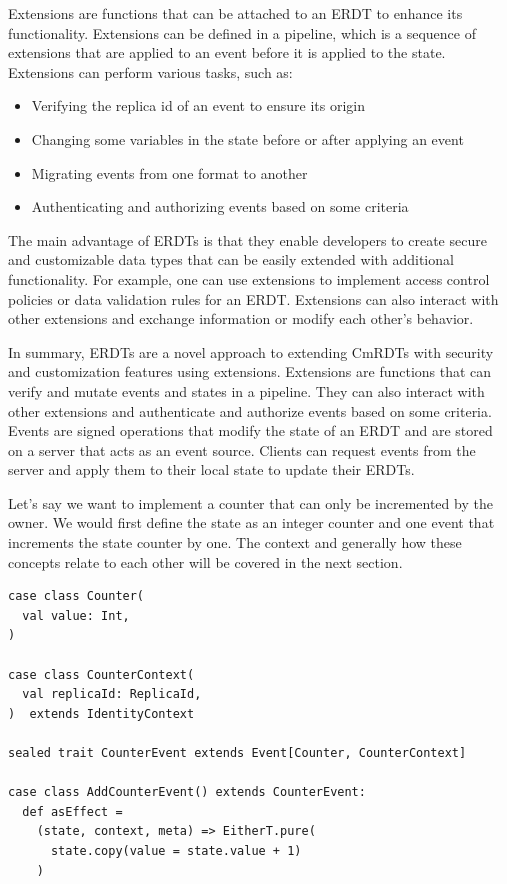 \documentclass[
	english,
	ruledheaders=section,   %
	class=report,		    %
	thesis={type=bachelor}, %
	accentcolor=9c,			%
	custommargins=true,    %
	marginpar=false,        %
	parskip=half-,          %
	fontsize=11pt,          %
]{tudapub}
\begin{document}
Extensions are functions that can be attached to an ERDT to enhance its functionality. Extensions can be defined in a pipeline, which is a sequence of extensions that are applied to an event before it is applied to the state. Extensions can perform various tasks, such as:

\begin{itemize}
  \item Verifying the replica id of an event to ensure its origin
  \item Changing some variables in the state before or after applying an event
  \item Migrating events from one format to another
  \item Authenticating and authorizing events based on some criteria
\end{itemize}

The main advantage of ERDTs is that they enable developers to create secure and customizable data types that can be easily extended with additional functionality. For example, one can use extensions to implement access control policies or data validation rules for an ERDT. Extensions can also interact with other extensions and exchange information or modify each other’s behavior.

In summary, ERDTs are a novel approach to extending CmRDTs with security and customization features using extensions. Extensions are functions that can verify and mutate events and states in a pipeline. They can also interact with other extensions and authenticate and authorize events based on some criteria. Events are signed operations that modify the state of an ERDT and are stored on a server that acts as an event source. Clients can request events from the server and apply them to their local state to update their ERDTs.


Let's say we want to implement a counter that can only be incremented by the owner. We would first define the state as an integer counter and one event that increments the state counter by one. The context and generally how these concepts relate to each other will be covered in the next section.

\begin{lstlisting}
case class Counter(
  val value: Int,
) 

case class CounterContext(
  val replicaId: ReplicaId,
)  extends IdentityContext

sealed trait CounterEvent extends Event[Counter, CounterContext]

case class AddCounterEvent() extends CounterEvent:
  def asEffect =
    (state, context, meta) => EitherT.pure(
      state.copy(value = state.value + 1)
    )

\end{lstlisting}
\end{document}

